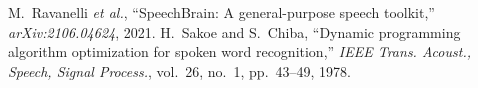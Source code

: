  M.~Ravanelli \emph{et al.}, ``SpeechBrain: A general-purpose speech toolkit,'' \emph{arXiv:2106.04624}, 2021.
 H.~Sakoe and S.~Chiba, ``Dynamic programming algorithm optimization for spoken word recognition,'' \emph{IEEE Trans. Acoust., Speech, Signal Process.}, vol.~26, no.~1, pp.\ 43--49, 1978.
